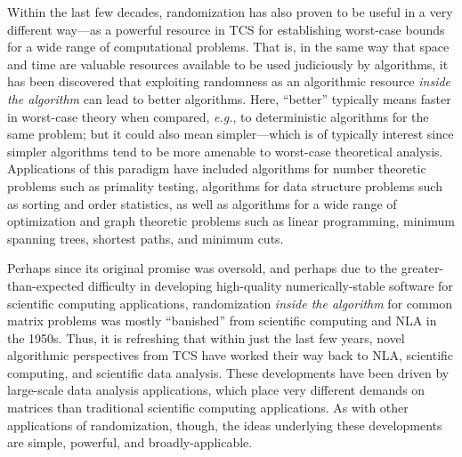 \documentclass[twoside]{article}
\begin{document}
Within the last few decades, randomization has also proven to be useful in 
a very different way---as a powerful resource in TCS for establishing 
worst-case bounds for a wide range of computational problems.
That is, in the same way that space and time are valuable resources 
available to be used judiciously by algorithms, it has been discovered 
that exploiting randomness as an algorithmic resource \emph{inside the 
algorithm} can lead to better algorithms.
Here, ``better'' typically means faster in worst-case theory when 
compared, \emph{e.g.}, to deterministic algorithms for the same problem;
but it could also mean simpler---which is of typically interest since 
simpler algorithms tend to be more amenable to worst-case theoretical 
analysis.
Applications of this paradigm have included algorithms for number 
theoretic problems such as primality testing, algorithms for data 
structure problems such as sorting and order statistics, as well as 
algorithms for a wide range of optimization and graph theoretic problems
such as linear programming, minimum spanning trees, shortest paths, and 
minimum cuts.

Perhaps since its original promise was oversold, and perhaps due to the 
greater-than-expected difficulty in developing high-quality 
numerically-stable software for scientific computing applications, 
randomization \emph{inside the algorithm} for common matrix problems was 
mostly ``banished'' from scientific computing and NLA in the 1950s. 
Thus, it is refreshing that within just the last few years, novel 
algorithmic perspectives from TCS have worked their way back to NLA, 
scientific computing, and scientific data analysis.
These developments have been driven by large-scale data analysis 
applications, which place very different demands on matrices than 
traditional scientific computing applications.
As with other applications of randomization, though, the ideas underlying 
these developments are simple, powerful, and broadly-applicable.
\end{document}
